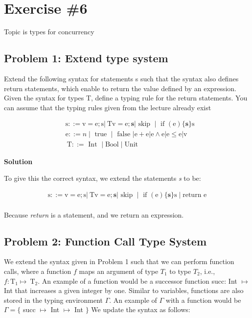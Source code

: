 \section{Exercise \#6}

Topic is types for concurrency


\subsection{Problem 1: Extend type system}

Extend the following syntax for statements s such that the syntax also defines
return statements, which enable to return the value defined by an expression. Given the syntax
for types T, define a typing rule for the return statements. You can assume that the typing rules
given from the lecture already exist

\begin{equation}
    \begin{aligned}
    & \mathrm{s}::=\mathrm{v}=\mathrm{e} ; \mathrm{s}|\mathrm{~T} \mathrm{v}=\mathrm{e} ; \mathbf{s}| \text { skip } \mid \text { if }(\mathrm{e})\{\mathbf{s}\} \mathrm{s} \\
    & \mathrm{e}::=n \mid \text { true } \mid \text { false }|\mathrm{e}+\mathrm{e}| \mathrm{e} \wedge \mathrm{e}|\mathrm{e} \leq \mathrm{e}| \mathrm{v} \\
    & \mathrm{~T}::=\text { Int } \mid \text{Bool} \mid \text{Unit}
    \end{aligned}
\end{equation}

\textbf{Solution}

To give this the correct syntax, we extend the statements \textit{s} to be: 

\begin{align*}
    \mathrm{s}::=\mathrm{v}=\mathrm{e} ; \mathrm{s}|\mathrm{~T} \mathrm{v}=\mathrm{e} ; \mathbf{s}| \text { skip } \mid \text { if }(\mathrm{e})\{\mathbf{s}\} \mathrm{s} \mid \text{return e} \\
\end{align*}

Because \textit{return} is a statement, and we return an expression. 


\subsection{Problem 2: Function Call Type System}

We extend the syntax given in Problem 1 such that we can perform function calls, 
where a function $f$ maps an argument of type $T_1$ to type $T_2$, i.e., $f: \mathrm{T}_1 \mapsto \mathrm{~T}_2$. 
An example of a function would be a successor function succ: Int $\mapsto$ Int that increases a given integer by one. 
Similar to variables, functions are also stored in the typing environment $\Gamma$. 
An example of $\Gamma$ with a function would be $\Gamma=\{$ succ $\mapsto$ Int $\mapsto$ Int $\}$ 
We update the syntax as follows:

